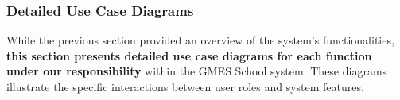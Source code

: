 \indent



\subsubsection{Detailed Use Case Diagrams}
\noindent
\begin{minipage}{\textwidth}
    \setlength{\parindent}{2em}
    While the previous section provided an overview of the system's functionalities, \textbf{this section presents detailed use case diagrams for each function under our responsibility} within the GMES School system. These diagrams illustrate the specific interactions between user roles and system features.
\end{minipage}
\vspace{0.5em}


